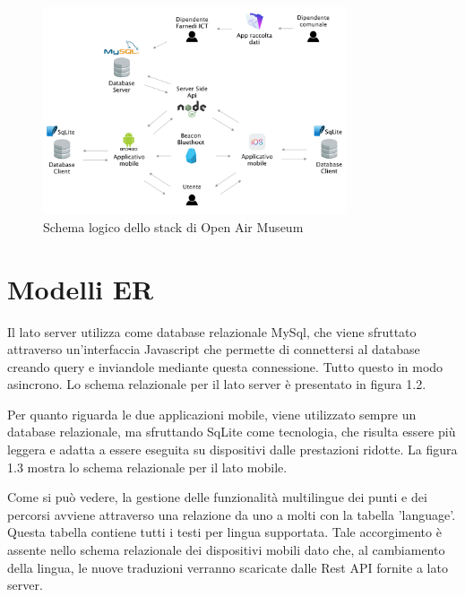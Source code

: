 \begin{figure}[h]
\centering
\includegraphics[width=0.8\textwidth]{images/SchemaOpenAirMuseum.png}
\caption{Schema logico dello stack di Open Air Museum}
\end{figure}

\section{Modelli ER}\vspace{5mm}
		
	Il lato server utilizza come database relazionale MySql, che viene sfruttato attraverso un'interfaccia Javascript che permette di connettersi al database creando query e inviandole mediante questa connessione. Tutto questo in modo asincrono. Lo schema relazionale per il lato server è presentato in figura 1.2.\vspace{5mm}
	
	Per quanto riguarda le due applicazioni mobile, viene utilizzato sempre un database relazionale, ma sfruttando SqLite come tecnologia, che risulta essere più leggera e adatta a essere eseguita su dispositivi dalle prestazioni ridotte. La figura 1.3 mostra lo schema relazionale per il lato mobile.\vspace{5mm}

Come si può vedere, la gestione delle funzionalità multilingue dei punti e dei percorsi avviene attraverso una relazione da uno a molti con la tabella 'language'. Questa tabella contiene tutti i testi per lingua supportata. Tale accorgimento è assente nello schema relazionale dei dispositivi mobili dato che, al cambiamento della lingua, le nuove traduzioni verranno scaricate dalle Rest API fornite a lato server.


